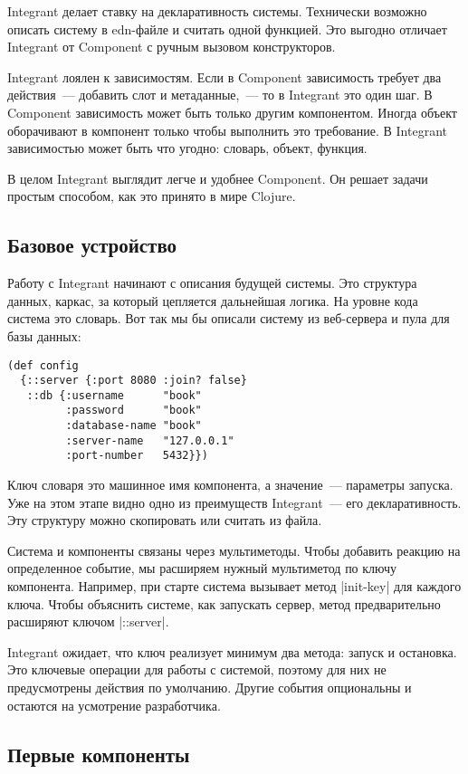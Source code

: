 Integrant делает ставку на декларативность системы. Технически возможно описать
систему в edn-файле и считать одной функцией. Это выгодно отличает Integrant от
Component с ручным вызовом конструкторов.

Integrant лоялен к зависимостям. Если в Component зависимость требует два
действия~--- добавить слот и метаданные,~--- то в Integrant это один шаг. В
Component зависимость может быть только другим компонентом. Иногда объект
оборачивают в компонент только чтобы выполнить это требование. В Integrant
зависимостью может быть что угодно: словарь, объект, функция.

В целом Integrant выглядит легче и удобнее Component. Он решает задачи простым
способом, как это принято в мире Clojure.

\subsection{Базовое устройство}

Работу с Integrant начинают с описания будущей системы. Это структура данных,
каркас, за который цепляется дальнейшая логика. На уровне кода система это
словарь. Вот так мы бы описали систему из веб-сервера и пула для базы данных:

\begin{verbatim}
(def config
  {::server {:port 8080 :join? false}
   ::db {:username      "book"
         :password      "book"
         :database-name "book"
         :server-name   "127.0.0.1"
         :port-number   5432}})
\end{verbatim}

Ключ словаря это машинное имя компонента, а значение~--- параметры запуска. Уже на
этом этапе видно одно из преимуществ Integrant~--- его декларативность. Эту
структуру можно скопировать или считать из файла.

Система и компоненты связаны через мультиметоды. Чтобы добавить реакцию на
определенное событие, мы расширяем нужный мультиметод по ключу
компонента. Например, при старте система вызывает метод \spverb|init-key| для каждого
ключа. Чтобы объяснить системе, как запускать сервер, метод предварительно
расширяют ключом \spverb|::server|.

Integrant ожидает, что ключ реализует минимум два метода: запуск и
остановка. Это ключевые операции для работы с системой, поэтому для них не
предусмотрены действия по умолчанию. Другие события опциональны и остаются на
усмотрение разработчика.

\subsection{Первые компоненты}

